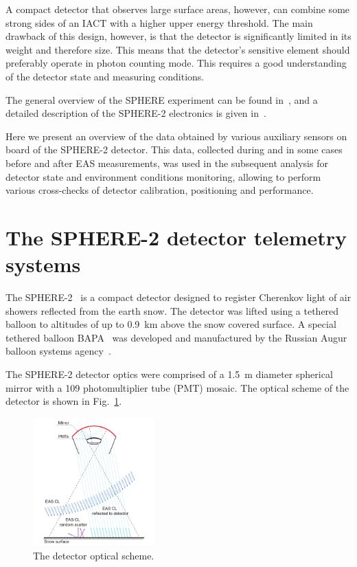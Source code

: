 \documentclass[final,5p,times,twocolumn]{elsarticle}
\begin{document}
A compact detector that observes large surface areas, however, can combine some strong sides of an IACT with a higher upper energy threshold. The main drawback of this design, however, is that the detector is significantly limited in its weight and therefore size. This means that the detector's sensitive element should preferably operate in photon counting mode. This requires a good understanding of the detector state and measuring conditions.

The general overview of the SPHERE experiment can be found in~\cite{Ant15a}, and a detailed description of the SPHERE-2 electronics is given in~\cite{Ant20}.


Here we present an overview of the data obtained by various auxiliary sensors on board of the SPHERE-2 detector. This data, collected during and in some cases before and after EAS measurements, was used in the subsequent analysis for detector state and environment conditions monitoring, allowing to perform various cross-checks of detector calibration, positioning and performance.


\section{The SPHERE-2 detector telemetry systems\label{sect:detector}}

The \mbox{SPHERE-2}~\cite{Ant20} is a compact detector designed to register Cherenkov light of air showers reflected from the earth snow. The detector was lifted using a tethered balloon to altitudes of up to 0.9~km above the snow covered surface. A special tethered balloon BAPA~\cite{Ant20} was developed and manufactured by the Russian Augur balloon systems agency~\cite{Augur}.

The \mbox{SPHERE-2} detector optics were comprised of a 1.5~m diameter spherical mirror with a 109 photomultiplier tube (PMT) mosaic. The optical scheme of the detector is shown in Fig.~\ref{fig:optics}.

\begin{figure}[bt]
\centering
    \includegraphics[width=0.42\textwidth]{optics}
    \caption{The detector optical scheme.}
\label{fig:optics}
\end{figure}
\end{document}
